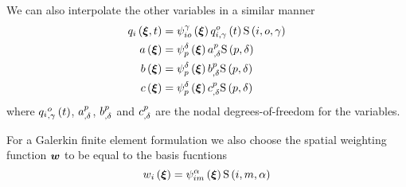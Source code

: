 We can also interpolate the other variables in a similar manner \ie
\begin{equation}
  \begin{split}
    \fnof{q_{i}}{\vectr{\xi},t} &= \idxgbfn{i}{o}{\gamma}{\vectr{\xi}}
    \fnof{\idxnodedof{q}{i}{o}{\gamma}}{t}\idxgsf{i}{o}{\gamma} \\
    \fnof{a}{\vectr{\xi}} &=\gbfn{p}{\delta}{\vectr{\xi}}
    \nodedof{a}{p}{\delta}\gsf{p}{\delta} \\
    \fnof{b}{\vectr{\xi}} &=\gbfn{p}{\delta}{\vectr{\xi}}\nodedof{b}{p}{\delta}
    \gsf{p}{\delta} \\
    \fnof{c}{\vectr{\xi}}
    &=\gbfn{p}{\delta}{\vectr{\xi}}\nodedof{c}{p}{\delta}\gsf{p}{\delta}
  \end{split}
\end{equation}
where $\fnof{\nodedof{q_{i}}{o}{\gamma}}{t}$, $\nodedof{a}{p}{\delta}$,
$\nodedof{b}{p}{\delta}$ and $\nodedof{c}{p}{\delta}$ are the
nodal degrees-of-freedom for the variables.

For a Galerkin finite element formulation we also choose the spatial weighting
function $\vectr{w}$ to be equal to the basis fucntions \ie
\begin{equation}
  \fnof{w_{i}}{\vectr{\xi}}=\idxgbfn{i}{m}{\alpha}{\vectr{\xi}}\idxgsf{i}{m}{\alpha}
\end{equation}



